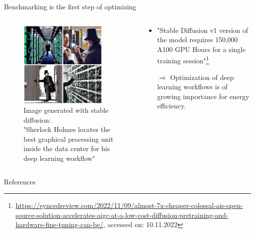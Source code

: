 \documentclass[compress,aspectratio=169]{beamer}
\begin{document}

\begin{frame}{Benchmarking is the first step of optimizing}
\label{pg:lastpage} %

\begin{columns}
        \begin{column}{0.5\textwidth}
            \centering
            \vspace{-1em}
            \begin{figure}
            \includegraphics[width=0.85\textwidth]{assets/Sherlock-Holmes-locates-the-best-graphical-processing-unit-inside-the-data-center-for-his-deep-learning-workflow}
            \caption*{Image generated with stable diffusion: \\
            \tiny{"Sherlock Holmes locates the best graphical processing unit inside the data center for his deep learning workflow"}}
            \end{figure}
        \end{column}
        \begin{column}{0.5\textwidth}
            \begin{itemize}
                \item "Stable Diffusion v1 version of the model requires 150,000 A100 GPU Hours for a single training session"\footnote{\tiny{\url{https://syncedreview.com/2022/11/09/almost-7x-cheaper-colossal-ais-open-source-solution-accelerates-aigc-at-a-low-cost-diffusion-pretraining-and-hardware-fine-tuning-can-be/}}, accessed on: 10.11.2022}
                \vspace{1em}
                \item[$\Rightarrow$] Optimization of deep learning workflows is of growing importance for energy efficiency.
            \end{itemize}
        \end{column}
    \end{columns}

\end{frame}

\begin{frame}{References}
    \renewcommand*{\bibfont}{\normalfont\scriptsize}
    \printbibliography[heading=none]
\end{frame}
\end{document}
